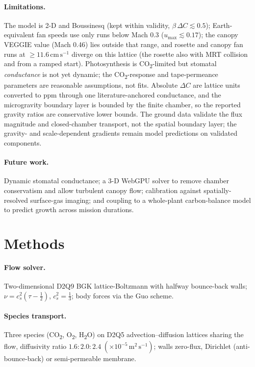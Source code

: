 \documentclass[10pt]{article}
\newcommand{\cmsu}{\ensuremath{\mathrm{cm\,s^{-1}}}}
\newcommand{\mseu}{\ensuremath{\mathrm{m^{2}\,s^{-1}}}}
\newcommand{\co}{CO\textsubscript{2}}
\newcommand{\oo}{O\textsubscript{2}}
\newcommand{\wo}{H\textsubscript{2}O}
\begin{document}
\paragraph{Limitations.} The model is 2-D and Boussinesq (kept within validity, $\beta\,\Delta C\lesssim0.5$);
Earth-equivalent fan speeds use only runs below Mach 0.3 ($u_{\max}\lesssim0.17$); the canopy VEGGIE value
(Mach 0.46) lies outside that range, and rosette and canopy fan runs at $\ge11.6\,\cmsu$ diverge on this lattice (the
rosette also with MRT collision and from a ramped start).
Photosynthesis is \co-limited but stomatal \emph{conductance} is not yet dynamic; the \co-response and tape-permeance
parameters are reasonable assumptions, not fits. Absolute $\Delta C$ are lattice units converted to ppm through one
literature-anchored conductance, and the microgravity boundary layer is bounded by the finite chamber, so the reported
gravity ratios are conservative lower bounds. The ground data validate the flux magnitude and closed-chamber transport,
not the spatial boundary layer; the gravity- and scale-dependent gradients remain model predictions on validated
components.

\paragraph{Future work.} Dynamic stomatal conductance; a 3-D WebGPU solver to remove chamber conservatism and allow
turbulent canopy flow; calibration against spatially-resolved surface-gas imaging; and coupling to a whole-plant
carbon-balance model to predict growth across mission durations.

\section{Methods}
\paragraph{Flow solver.} Two-dimensional D2Q9 BGK lattice-Boltzmann with halfway bounce-back walls;
$\nu=c_s^2(\tau-\tfrac12)$, $c_s^2=\tfrac13$; body forces via the Guo scheme.
\paragraph{Species transport.} Three species (\co, \oo, \wo) on D2Q5 advection--diffusion lattices sharing the flow,
diffusivity ratio $1.6:2.0:2.4\;(\times10^{-5}\,\mseu)$; walls zero-flux, Dirichlet
(anti-bounce-back) or semi-permeable membrane.
\end{document}
